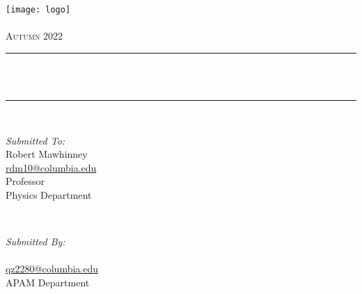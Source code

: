 \begin{titlepage}
    \centering
    \vspace*{0.5 cm}
    \texttt{[image: logo]}\\[1.0 cm]
    \textsc{\LARGE \institution}\\[2.0 cm]
    \textsc{\Large Autumn 2022}\\[0.5 cm]
    \rule{\linewidth}{0.2 mm}\\[0.4 cm]
    {\huge \bfseries \thetitle}\\
    \rule{\linewidth}{0.2 mm}\\[1.5 cm]

    \begin{minipage}{0.4\textwidth}
        \begin{flushleft} \large
            \emph{Submitted To:}\\
            Robert Mawhinney\\
            \href{mailto:rdm10@columbia.edu}{rdm10@columbia.edu}\\
            Professor\\
            Physics Department\\
        \end{flushleft}
    \end{minipage}~
    \begin{minipage}{0.4\textwidth}
        \begin{flushright} \large
            \emph{Submitted By:} \\
            \theauthor\\
            \href{mailto:qz2280@columbia.edu}{qz2280@columbia.edu}\\
            APAM Department\\
            \thedate\\
        \end{flushright}
    \end{minipage}\\[2 cm]
\end{titlepage}

\newpage
